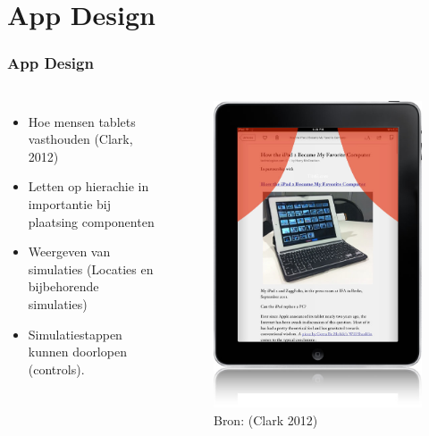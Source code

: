 \documentclass[10pt,a4paper]{beamer}
\begin{document}
\section{App Design}
\begin{frame}
\frametitle{App Design}
\begin{columns}[c]
\column{5cm}
\begin{itemize}
\item Hoe mensen tablets vasthouden (Clark, 2012)
\item Letten op hierachie in importantie bij plaatsing componenten
\item Weergeven van simulaties (Locaties en bijbehorende simulaties)
\item Simulatiestappen kunnen doorlopen (controls).
\end{itemize}
\column{5cm}
\begin{figure}
\includegraphics[scale=0.2]{touch.png}
\caption{Bron: \url{} (Clark 2012)}
\end{figure}
\end{columns}
\end{frame}
\end{document}
